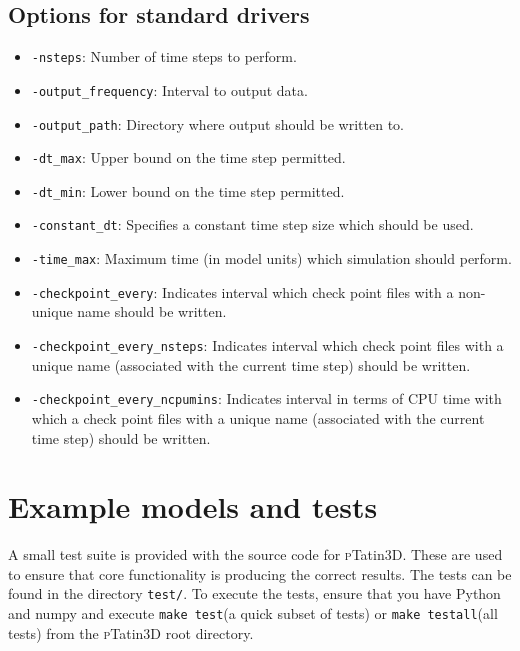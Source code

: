 \documentclass[paper=a4, fontsize=11pt,twoside]{scrartcl}
\newcommand{\ptat}{{{\textsc pTatin3D}}}
\newcommand{\unix}[1]{\texttt{\footnotesize #1}}
\begin{document}
{{\subsection{Options for standard drivers}
\begin{itemize}
	\item \unix{-nsteps}: Number of time steps to perform.
	\item \unix{-output\_frequency}: Interval to output data.
	\item \unix{-output\_path}: Directory where output should be written to.
	\item \unix{-dt\_max}: Upper bound on the time step permitted.
	\item \unix{-dt\_min}: Lower bound on the time step permitted.
	\item \unix{-constant\_dt}: Specifies a constant time step size which should be used.
	\item \unix{-time\_max}: Maximum time (in model units) which simulation should perform.
	\item \unix{-checkpoint\_every}: Indicates interval which check point files with a non-unique name should be written.
	\item \unix{-checkpoint\_every\_nsteps}: Indicates interval which check point files with a unique name (associated with the current time step) should be written.
	\item \unix{-checkpoint\_every\_ncpumins}: Indicates interval in terms of CPU time with which a check point files with a unique name (associated with the current time step) should be written.
\end{itemize}

\newpage
\section{Example models and tests}
A small test suite is provided with the source code for {\ptat}. These are used to ensure that core functionality is producing the correct results. The tests can be found in the directory \unix{test/}. To execute the tests, ensure that you have Python and numpy and execute \unix{make test}(a quick subset of tests) or \unix{make testall}(all tests) from the \ptat{} root directory.

}}
\end{document}
